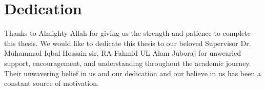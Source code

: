 \section*{Dedication}
Thanks to Almighty Allah for giving us the strength and patience to complete this thesis. We would like to dedicate this thesis to our beloved Supervisor Dr. Muhammad Iqbal Hossain sir, RA Fahmid UL Alam Juboraj for unwearied support, encouragement, and understanding throughout the academic journey. Their unwavering belief in us and our dedication and our believe in us has been a constant source of motivation.

\pagebreak